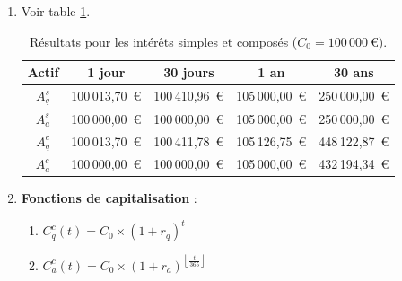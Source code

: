 \documentclass{article}
\begin{document}
\begin{enumerate}[label=\textbf{R2.\arabic*}]
                \item Voir table \ref{tab:compound_interest_results}.
                \begin{table}[h!]
                    \centering
                    \begin{tabular}{|c|c|c|c|c|}
                        \hline
                        \textbf{Actif} & \textbf{1 jour}  & \textbf{30 jours} & \textbf{1 an}    & \textbf{30 ans}  \\
                        \hline
                        \( A_q^s \)    & 100\,013,70\ € & 100\,410,96\ €  & 105\,000,00\ € & 250\,000,00\ € \\
                        \hline
                        \( A_a^s \)    & 100\,000,00\ € & 100\,000,00\ €  & 105\,000,00\ € & 250\,000,00\ € \\
                        \hline
                        \( A_q^c \)    & 100\,013,70\ € & 100\,411,78\ €  & 105\,126,75\ € & 448\,122,87\ € \\
                        \hline
                        \( A_a^c \)    & 100\,000,00\ € & 100\,000,00\ €  & 105\,000,00\ € & 432\,194,34\ € \\
                        \hline
                    \end{tabular}
                    \caption{Résultats pour les intérêts simples et composés (\( C_0 = 100\,000\ \text{€} \)).}
                    \label{tab:compound_interest_results}
                \end{table} 
                
                \item \textbf{Fonctions de capitalisation} :
                    \begin{enumerate}[label=(\alph*)]
                        \item \( C_q^c(t) = C_0 \times \left(1 + r_q \right)^t \)
                        \item \( C_a^c(t) = C_0 \times \left(1 + r_a \right)^{\left\lfloor\frac{t}{365}\right\rfloor} \)
                    \end{enumerate}
            \end{enumerate}

                
\end{document}
